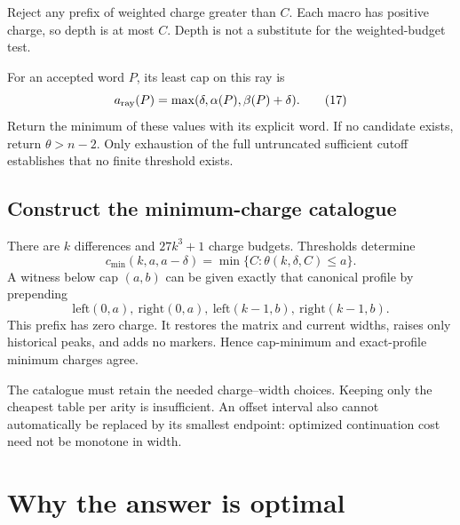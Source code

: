 \documentclass[11pt,letterpaper]{article}
\begin{document}
Reject any prefix of weighted charge greater than \(C\).
Each macro has positive charge, so depth is at most \(C\).
Depth is not a substitute for the weighted-budget test.

For an accepted word \(P\), its least cap on this ray is
\[
a_{\rm ray}(P)=\max(\delta,\alpha(P),\beta(P)+\delta).
\tag{17}
\]
Return the minimum of these values with its explicit word.
If no candidate exists, return \(\theta>n-2\).
Only exhaustion of the full untruncated sufficient cutoff establishes
that no finite threshold exists.

\subsection{Construct the minimum-charge catalogue}
There are \(k\) differences and \(27k^3+1\) charge budgets.
Thresholds determine
\[
c_{\min}(k,a,a-\delta)
=\min\{C:\theta(k,\delta,C)\le a\}.
\tag{18}
\]
A witness below cap \((a,b)\) can be given exactly that canonical
profile by prepending
\[
\mathrm{left}(0,a),\ \mathrm{right}(0,a),\
\mathrm{left}(k-1,b),\ \mathrm{right}(k-1,b).
\tag{19}
\]
This prefix has zero charge. It restores the matrix and current
widths, raises only historical peaks, and adds no markers.
Hence cap-minimum and exact-profile minimum charges agree.

The catalogue must retain the needed charge--width choices.
Keeping only the cheapest table per arity is insufficient.
An offset interval also cannot automatically be replaced by its
smallest endpoint: optimized continuation cost need not be monotone
in width.

\section{Why the answer is optimal}\label{sec:optimal}
\end{document}
